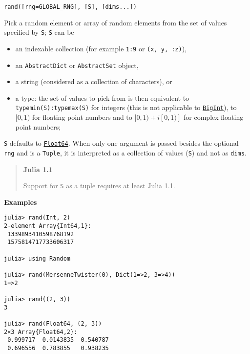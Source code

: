 \begin{adjustwidth}{2em}{0pt}


\begin{verbatim}
rand([rng=GLOBAL_RNG], [S], [dims...])
\end{verbatim}

Pick a random element or array of random elements from the set of values specified by \texttt{S}; \texttt{S} can be

\begin{itemize}
\item an indexable collection (for example \texttt{1:9} or \texttt{({\textquotesingle}x{\textquotesingle}, {\textquotedbl}y{\textquotedbl}, :z)}),


\item an \texttt{AbstractDict} or \texttt{AbstractSet} object,


\item a string (considered as a collection of characters), or


\item a type: the set of values to pick from is then equivalent to \texttt{typemin(S):typemax(S)} for integers (this is not applicable to \hyperlink{423405808990690832}{\texttt{BigInt}}), to  \([0, 1)\)  for floating point numbers and to  \([0, 1)+i[0, 1)]\)  for complex floating point numbers;

\end{itemize}
\texttt{S} defaults to \hyperlink{5027751419500983000}{\texttt{Float64}}. When only one argument is passed besides the optional \texttt{rng} and is a \texttt{Tuple}, it is interpreted as a collection of values (\texttt{S}) and not as \texttt{dims}.

\begin{quote}
\textbf{Julia 1.1}

Support for \texttt{S} as a tuple requires at least Julia 1.1.

\end{quote}
\textbf{Examples}


\begin{verbatim}
julia> rand(Int, 2)
2-element Array{Int64,1}:
 1339893410598768192
 1575814717733606317

julia> using Random

julia> rand(MersenneTwister(0), Dict(1=>2, 3=>4))
1=>2

julia> rand((2, 3))
3

julia> rand(Float64, (2, 3))
2×3 Array{Float64,2}:
 0.999717  0.0143835  0.540787
 0.696556  0.783855   0.938235
\end{verbatim}


\end{adjustwidth}
